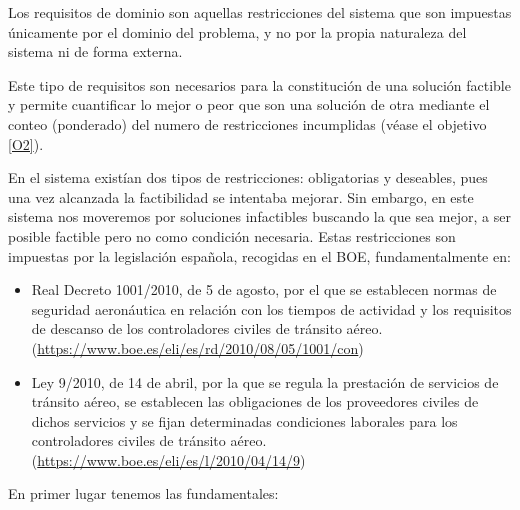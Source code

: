Los requisitos de dominio son aquellas restricciones del sistema que son impuestas únicamente por el dominio del problema, y no por la propia naturaleza del sistema ni de forma externa.

Este tipo de requisitos son necesarios para la constitución de una solución factible y permite cuantificar lo mejor o peor que son una solución de otra mediante el conteo (ponderado) del numero de restricciones incumplidas (véase el objetivo \ref{O2}). 

En el sistema \legacy{} existían dos tipos de restricciones: obligatorias y deseables, pues una vez alcanzada la factibilidad se intentaba mejorar. Sin embargo, en este sistema nos moveremos por soluciones infactibles buscando la que sea mejor, a ser posible factible pero no como condición necesaria. Estas restricciones son impuestas por la legislación española, recogidas en el BOE, fundamentalmente en:

\begin{itemize}
	\item Real Decreto 1001/2010, de 5 de agosto, por el que se establecen normas de seguridad aeronáutica en relación con los tiempos de actividad y los requisitos de descanso de los controladores civiles de tránsito aéreo. \\
	(\url{https://www.boe.es/eli/es/rd/2010/08/05/1001/con})
	
	\item Ley 9/2010, de 14 de abril, por la que se regula la prestación de servicios de tránsito aéreo, se establecen las obligaciones de los proveedores civiles de dichos servicios y se fijan determinadas condiciones laborales para los controladores civiles de tránsito aéreo. \\
	(\url{https://www.boe.es/eli/es/l/2010/04/14/9})
\end{itemize} 



En primer lugar tenemos las fundamentales:

